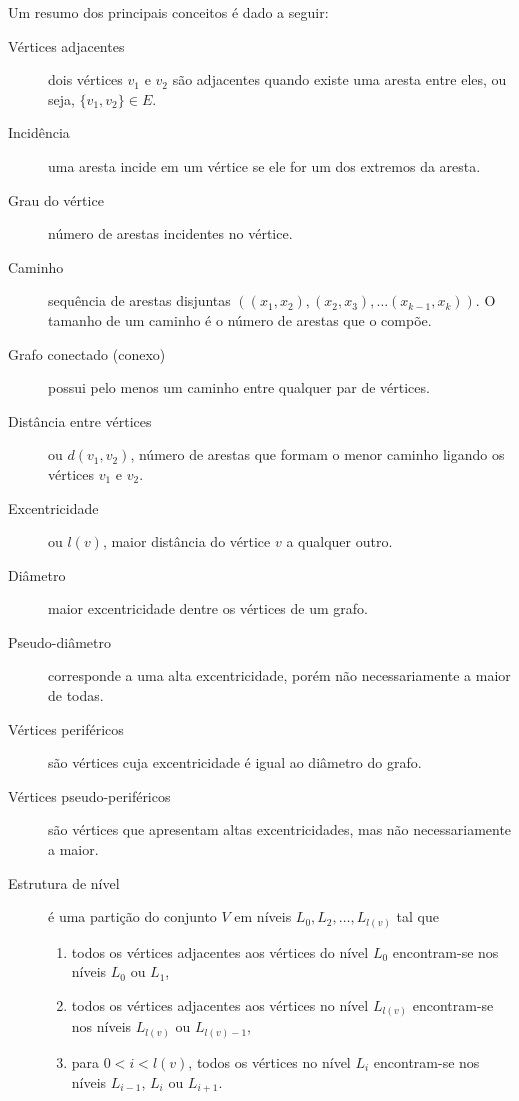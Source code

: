 Um resumo dos principais conceitos é dado a seguir:
\begin{description}
    \item[Vértices adjacentes]  dois vértices $v_1$ e $v_2$ são adjacentes
        quando existe uma aresta entre eles, ou seja, $\{v_1, v_2\} \in E$.
    \item[Incidência] uma aresta incide em um vértice se ele for um dos extremos
        da aresta.
    \item[Grau do vértice] número de arestas incidentes no vértice.
    \item[Caminho] sequência de arestas disjuntas $\left( (x_1, x_2), (x_2,
        x_3), \ldots (x_{k - 1}, x_k) \right)$. O tamanho de um caminho é o
        número de arestas que o compõe.
    \item[Grafo conectado (conexo)] possui pelo menos um caminho entre qualquer
        par de vértices.
    \item[Distância entre vértices] ou $d(v_1, v_2)$, número de arestas que
        formam o menor caminho ligando os vértices $v_1$ e $v_2$.
    \item[Excentricidade] ou $l(v)$, maior distância do vértice $v$ a qualquer outro.
    \item[Diâmetro] maior excentricidade dentre os vértices de um grafo.
    \item[Pseudo-diâmetro] corresponde a uma alta excentricidade, porém não
        necessariamente a maior de todas.
    \item[Vértices periféricos] são vértices cuja excentricidade é igual ao
        diâmetro do grafo.
    \item[Vértices pseudo-periféricos] são vértices que apresentam altas
        excentricidades, mas não necessariamente a maior.
    \item[Estrutura de nível] é uma partição do conjunto $V$ em níveis $L_0,
        L_2, \ldots, L_{l(v)}$ tal que
        \begin{enumerate}
            \item todos os vértices adjacentes aos vértices do nível $L_0$
                encontram-se nos níveis $L_0$ ou $L_1$,
            \item todos os vértices adjacentes aos vértices no nível $L_{l(v)}$
                encontram-se nos níveis $L_{l(v)}$ ou $L_{l(v) - 1}$,
            \item para $0 < i < l(v)$, todos os vértices no nível $L_i$
                encontram-se nos níveis $L_{i - 1}$, $L_i$ ou $L_{i + 1}$.
        \end{enumerate}


\end{description}
